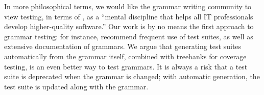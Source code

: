 
In more philosophical terms, we would like the grammar writing
community to view testing, in terms of \citet{beizer2003software}, as
a ``mental discipline that helps all IT professionals develop
higher-quality software.''  Our work is by no means the first approach
to grammar testing: for instance, \citet{butt1999lfg} recommend
frequent use of test suites, as well as extensive documentation of
grammars. We argue that generating test suites automatically from the
grammar itself, combined with treebanks for coverage testing, is an
even better way to test grammars. It is always a risk that a test
suite is deprecated when the grammar is changed; with automatic
generation, the test suite is updated along with the grammar.




